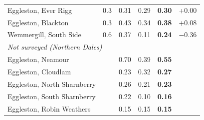 \begin{tabular}{lrrrrr}
Eggleston, Ever Rigg & 0.3 & 0.31 & 0.29 & \textbf{0.30} & +0.00 \\
Eggleston, Blackton & 0.3 & 0.43 & 0.34 & \textbf{0.38} & +0.08 \\
Wemmergill, South Side & 0.6 & 0.37 & 0.11 & \textbf{0.24} & $-$0.36 \\
\midrule
\multicolumn{6}{l}{\textit{Not surveyed (Northern Dales)}} \\
Eggleston, Neamour &  & 0.70 & 0.39 & \textbf{0.55} &  \\
Eggleston, Cloudlam &  & 0.23 & 0.32 & \textbf{0.27} &  \\
Eggleston, North Sharnberry &  & 0.26 & 0.21 & \textbf{0.23} &  \\
Eggleston, South Sharnberry &  & 0.22 & 0.10 & \textbf{0.16} &  \\
Eggleston, Robin Weathers &  & 0.15 & 0.15 & \textbf{0.15} &  \\
\bottomrule
\end{tabular}
